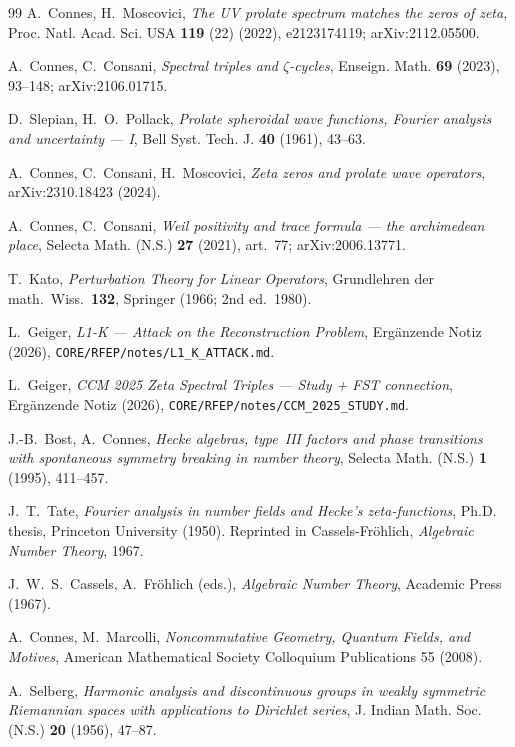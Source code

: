 \documentclass[11pt,a4paper]{article}
\theoremstyle{plain}
\theoremstyle{definition}
\begin{document}
\begin{thebibliography}{99}
A.~Connes, H.~Moscovici,
\textit{The UV prolate spectrum matches the zeros of zeta},
Proc. Natl. Acad. Sci. USA \textbf{119} (22) (2022), e2123174119;
arXiv:2112.05500.

A.~Connes, C.~Consani,
\textit{Spectral triples and $\zeta$-cycles},
Enseign. Math. \textbf{69} (2023), 93--148; arXiv:2106.01715.

D.~Slepian, H.~O.~Pollack,
\textit{Prolate spheroidal wave functions, Fourier analysis and
uncertainty --- I},
Bell Syst. Tech. J. \textbf{40} (1961), 43--63.

A.~Connes, C.~Consani, H.~Moscovici,
\textit{Zeta zeros and prolate wave operators},
arXiv:2310.18423 (2024).

A.~Connes, C.~Consani,
\textit{Weil positivity and trace formula --- the archimedean place},
Selecta Math. (N.S.) \textbf{27} (2021), art.~77; arXiv:2006.13771.

T.~Kato,
\textit{Perturbation Theory for Linear Operators},
Grundlehren der math.\ Wiss.\ \textbf{132}, Springer (1966; 2nd ed.\ 1980).

L.~Geiger,
\textit{L1-K --- Attack on the Reconstruction Problem},
Ergänzende Notiz (2026),
\texttt{CORE/RFEP/notes/L1\_K\_ATTACK.md}.

L.~Geiger,
\textit{CCM 2025 Zeta Spectral Triples --- Study + FST connection},
Ergänzende Notiz (2026),
\texttt{CORE/RFEP/notes/CCM\_2025\_STUDY.md}.

J.-B.~Bost, A.~Connes,
\textit{Hecke algebras, type~III factors and phase transitions
with spontaneous symmetry breaking in number theory},
Selecta Math. (N.S.) \textbf{1} (1995), 411--457.

J.~T.~Tate,
\textit{Fourier analysis in number fields and Hecke's
zeta-functions},
Ph.D. thesis, Princeton University (1950). Reprinted in
Cassels-Fr\"ohlich, \emph{Algebraic Number Theory}, 1967.

J.~W.~S.~Cassels, A.~Fr\"ohlich (eds.),
\textit{Algebraic Number Theory},
Academic Press (1967).

A.~Connes, M.~Marcolli,
\textit{Noncommutative Geometry, Quantum Fields, and Motives},
American Mathematical Society Colloquium Publications 55 (2008).

A.~Selberg,
\textit{Harmonic analysis and discontinuous groups in weakly
symmetric Riemannian spaces with applications to Dirichlet series},
J. Indian Math. Soc. (N.S.) \textbf{20} (1956), 47--87.


\end{thebibliography}
\end{document}
